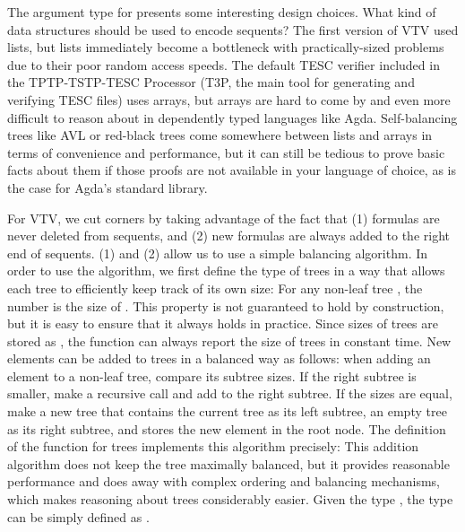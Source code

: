 \documentclass[12pt]{article}
\begin{document}
The argument type  for  presents some 
interesting design choices. What kind of data structures should be used 
to encode sequents? The first version of VTV used lists, but lists immediately become 
a bottleneck with practically-sized problems due to their poor random access speeds. 
The default TESC verifier included in the TPTP-TSTP-TESC Processor (T3P, the main 
tool for generating and verifying TESC files) uses arrays, 
but arrays are hard to come by and even more difficult to reason about in dependently 
typed languages like Agda. Self-balancing trees like AVL or red-black trees come 
somewhere between lists and arrays in terms of convenience and performance, but it 
can still be tedious to prove basic facts about them if those proofs are not 
available in your language of choice, as is the case for Agda's standard library.

For VTV, we cut corners by taking advantage of the fact that (1) formulas 
are never deleted from sequents, and (2) new formulas are always added to the 
right end of sequents. (1) and (2) allow us to use a simple balancing algorithm.
In order to use the algorithm, we first define the type of trees in a way that 
allows each tree to efficiently keep track of its own size:
For any non-leaf tree     ,
the number  is the size of     .
This property is not guaranteed to hold by construction, but it is easy to ensure that it always holds in practice. 
Since sizes of trees are stored as , the function 
 \AgdaSymbol{:}   
can always report the size of trees in constant time. New elements can be added to trees 
in a balanced way as follows: when adding an element to a non-leaf tree, 
compare its subtree sizes. If the right subtree is smaller, make a recursive call and add to the 
right subtree. If the sizes are equal, make a new tree that contains the current tree as its left subtree, 
an empty tree as its right subtree, and stores the new element in the root node.
The definition of the  function for trees implements this algorithm precisely:
This addition algorithm does not keep the tree maximally balanced, but it provides 
reasonable performance and does away with complex ordering and balancing mechanisms, 
which makes reasoning about trees considerably easier. Given the type , 
the type  can be simply defined as .
\end{document}
